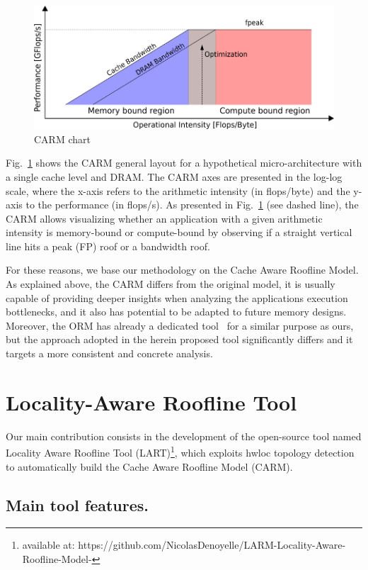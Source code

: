 \documentclass[twoside,twocolumn,8pt]{extarticle}
\begin{document}
\begin{figure}
  \centering
  \includegraphics[width=.48\textwidth]{pictures/CARM_chart.png}
  \caption{CARM chart}
  \label{fig:CARM_chart}
\end{figure}

Fig.~\ref{fig:CARM_chart} shows the CARM general layout for a hypothetical micro-architecture with a single cache level and DRAM.
The CARM axes are presented in the log-log scale, where the x-axis refers to the arithmetic intensity (in flops/byte) and the
y-axis to the performance (in flops/s). As presented in Fig.~\ref{fig:CARM_chart} (see dashed line), the CARM allows visualizing
whether an application with a given arithmetic intensity is memory-bound or compute-bound by observing if a straight vertical line
hits a peak (FP) roof or a bandwidth roof.

For these reasons, we base our methodology on the Cache Aware Roofline Model. 
As explained above, the CARM differs from the original model, it is usually capable of providing deeper insights when analyzing the
applications execution bottlenecks, and it also has potential to be adapted to future memory designs. Moreover, the ORM has already
a dedicated tool~\cite{Lo2015} for a similar purpose as ours, but the approach adopted in the herein proposed tool significantly
differs and it targets a more consistent and concrete analysis.

\section{Locality-Aware Roofline Tool}\label{sec:contrib}

Our main contribution consists in the development of the open-source tool named Locality Aware Roofline Tool (LART)\footnote{available at: https://github.com/NicolasDenoyelle/LARM-Locality-Aware-Roofline-Model-}, which
exploits hwloc topology detection to automatically build the Cache Aware Roofline Model (CARM).

\subsection{Main tool features.}
\label{sub:tool_features}
\end{document}
